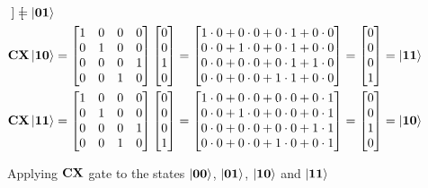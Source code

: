 \begin{figure}[H]
\begin{align*}
\begin{bmatrix}
        \end{bmatrix}
        =\ket{\mathbf{0}\mathbf{1}}\\
        \mathbf{CX}\ket{\mathbf{1}\mathbf{0}}&=\begin{bmatrix} 1 & 0 & 0 & 0\\ 0 & 1 & 0 & 0\\ 0 & 0 & 0 & 1\\ 0 & 0 & 1 & 0\\ \end{bmatrix}
        \begin{bmatrix}
            0\\
            0\\
            1\\
            0\\
        \end{bmatrix}
        =
        \begin{bmatrix}
            1\cdot 0 + 0\cdot 0 + 0\cdot 1 + 0\cdot 0\\
            0\cdot 0 + 1\cdot 0 + 0\cdot 1 + 0\cdot 0\\
            0\cdot 0 + 0\cdot 0 + 0\cdot 1 + 1\cdot 0\\
            0\cdot 0 + 0\cdot 0 + 1\cdot 1 + 0\cdot 0\\
        \end{bmatrix}=
        \begin{bmatrix}
            0\\
            0\\
            0\\
            1\\
        \end{bmatrix}
        =\ket{\mathbf{1}\mathbf{1}}\\
        \mathbf{CX}\ket{\mathbf{1}\mathbf{1}}&=\begin{bmatrix} 1 & 0 & 0 & 0\\ 0 & 1 & 0 & 0\\ 0 & 0 & 0 & 1\\ 0 & 0 & 1 & 0\\ \end{bmatrix}
        \begin{bmatrix}
            0\\
            0\\
            0\\
            1\\
        \end{bmatrix}
        =
        \begin{bmatrix}
            1\cdot 0 + 0\cdot 0 + 0\cdot 0 + 0\cdot 1\\
            0\cdot 0 + 1\cdot 0 + 0\cdot 0 + 0\cdot 1\\
            0\cdot 0 + 0\cdot 0 + 0\cdot 0 + 1\cdot 1\\
            0\cdot 0 + 0\cdot 0 + 1\cdot 0 + 0\cdot 1\\
        \end{bmatrix}=
        \begin{bmatrix}
            0\\
            0\\
            1\\
            0\\
        \end{bmatrix}
        =\ket{\mathbf{1}\mathbf{0}}
    \end{align*}
    \caption{Applying $\mathbf{CX}$ gate to the states $\ket{\mathbf{0}\mathbf{0}}$, $\ket{\mathbf{0}\mathbf{1}}$, $\ket{\mathbf{1}\mathbf{0}}$ and $\ket{\mathbf{1}\mathbf{1}}$}
    \label{fig:app_cx}
\end{figure}

